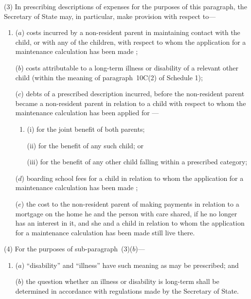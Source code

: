 \documentclass[12pt,a4paper]{article}
\begin{document}
(3) In prescribing descriptions of expenses for the purposes of this paragraph, the Secretary of State may, in particular, make provision with respect to—
\begin{enumerate}\item[]
($a$) costs incurred by a non-resident parent in maintaining contact with the child, or with any of the children, with respect to whom the application for a maintenance calculation has been made%
;

($b$) costs attributable to a long-term illness or disability of a relevant other child (within the meaning of paragraph~10C(2)  of Schedule 1);

($c$) debts of a prescribed description incurred, before the non-resident parent became a non-resident parent in relation to a child with respect to whom the maintenance calculation has been applied for%
—
\begin{enumerate}\item[]
(i) for the joint benefit of both parents;

(ii) for the benefit of any such child; or

(iii) for the benefit of any other child falling within a prescribed category;
\end{enumerate}

($d$) boarding school fees for a child in relation to whom the application for a maintenance calculation has been made%
;

($e$) the cost to the non-resident parent of making payments in relation to a mortgage on the home he and the person with care shared, if he no longer has an interest in it, and she and a child in relation to whom the application for a maintenance calculation has been made 
still live there.
\end{enumerate}

(4) For the purposes of sub-paragraph~(3)($b$)—
\begin{enumerate}\item[]
($a$) “disability” and “illness” have such meaning as may be prescribed; and

($b$) the question whether an illness or disability is long-term shall be determined in accordance with regulations made by the Secretary of State.
\end{enumerate}
\end{document}
